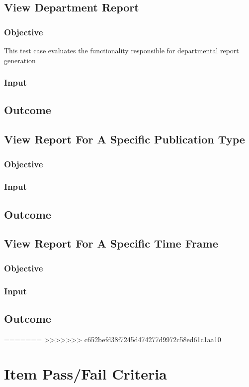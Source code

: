 \subsection{View Department Report}
\subsubsection{Objective}
This test case evaluates the functionality responsible for departmental report generation

\subsubsection{Input}
\subsection{Outcome}

\subsection{View Report For A Specific Publication Type}
\subsubsection{Objective}
\subsubsection{Input}
\subsection{Outcome}

\subsection{View Report For A Specific Time Frame}
\subsubsection{Objective}
\subsubsection{Input}
\subsection{Outcome}
=======
>>>>>>> c652befd38f7245d474277d9972c58ed61c1aa10
\section{Item Pass/Fail Criteria}
  

